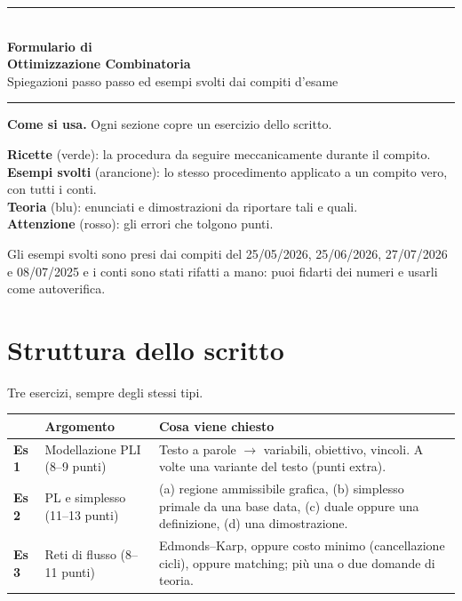 \documentclass[11pt,a4paper]{article}
\begin{document}
\thispagestyle{empty}
\vspace*{3cm}
\begin{center}
{\color{navy}\rule{\textwidth}{2pt}}\\[1.2em]
{\Huge\bfseries\color{navy} Formulario di\\[0.3em] Ottimizzazione Combinatoria}\\[1.2em]
{\large Spiegazioni passo passo ed esempi svolti dai compiti d'esame}\\[1em]
{\color{navy}\rule{\textwidth}{2pt}}
\end{center}
\vfill
\begin{idea}
\textbf{Come si usa.} Ogni sezione copre un esercizio dello scritto.

\textbf{Ricette} (verde): la procedura da seguire meccanicamente durante il compito.\\
\textbf{Esempi svolti} (arancione): lo stesso procedimento applicato a un compito vero, con tutti i conti.\\
\textbf{Teoria} (blu): enunciati e dimostrazioni da riportare tali e quali.\\
\textbf{Attenzione} (rosso): gli errori che tolgono punti.

Gli esempi svolti sono presi dai compiti del 25/05/2026, 25/06/2026, 27/07/2026 e 08/07/2025
e i conti sono stati rifatti a mano: puoi fidarti dei numeri e usarli come autoverifica.
\end{idea}
\newpage

\thispagestyle{empty}
\tableofcontents
\newpage

\section{Struttura dello scritto}

Tre esercizi, sempre degli stessi tipi.

\begin{center}
\begin{tabular}{@{}p{0.9cm} p{5.0cm} p{7.9cm}@{}}
\toprule
& \textbf{Argomento} & \textbf{Cosa viene chiesto}\\
\midrule
\textbf{Es 1} & Modellazione PLI \newline (8--9 punti) &
Testo a parole $\to$ variabili, obiettivo, vincoli. A volte una variante del testo (punti extra).\\
\addlinespace
\textbf{Es 2} & PL e simplesso \newline (11--13 punti) &
(a) regione ammissibile grafica, (b) simplesso primale da una base data, (c) duale oppure una definizione, (d) una dimostrazione.\\
\addlinespace
\textbf{Es 3} & Reti di flusso \newline (8--11 punti) &
Edmonds--Karp, oppure costo minimo (cancellazione cicli), oppure matching; più una o due domande di teoria.\\
\bottomrule
\end{tabular}
\end{center}
\end{document}
